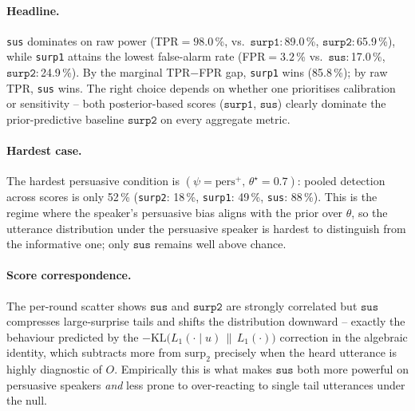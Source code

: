 \documentclass[11pt]{article}
\newcommand{\pers}{\mathrm{pers}}
\newcommand{\surp}{\mathrm{surp}}
\newcommand{\KL}{\mathrm{KL}}
\begin{document}
\paragraph{Headline.} \texttt{sus} dominates on raw power (TPR$=98.0$\,\%, vs.\ $\texttt{surp1}$:\,89.0\,\%, $\texttt{surp2}$:\,65.9\,\%), while \texttt{surp1} attains the lowest false-alarm rate (FPR$=3.2$\,\% vs.\ $\texttt{sus}$:\,17.0\,\%, $\texttt{surp2}$:\,24.9\,\%).  By the marginal TPR$-$FPR gap, \texttt{surp1} wins (85.8\,\%); by raw TPR, \texttt{sus} wins.  The right choice depends on whether one prioritises calibration or sensitivity -- both posterior-based scores ($\texttt{surp1}$, $\texttt{sus}$) clearly dominate the prior-predictive baseline $\texttt{surp2}$ on every aggregate metric.  \paragraph{Hardest case.} The hardest persuasive condition is $(\psi{=}\pers^{+},\,\theta^\star{=}0.7)$: pooled detection across scores is only 52\,\% (\texttt{surp2}: 18\,\%, \texttt{surp1}: 49\,\%, \texttt{sus}: 88\,\%).  This is the regime where the speaker's persuasive bias aligns with the prior over $\theta$, so the utterance distribution under the persuasive speaker is hardest to distinguish from the informative one; only $\texttt{sus}$ remains well above chance.  \paragraph{Score correspondence.} The per-round scatter shows $\texttt{sus}$ and $\texttt{surp2}$ are strongly correlated but $\texttt{sus}$ compresses large-surprise tails and shifts the distribution downward -- exactly the behaviour predicted by the $-\KL\bigl(L_1(\cdot\mid u)\,\|\,L_1(\cdot)\bigr)$ correction in the algebraic identity, which subtracts more from $\surp_2$ precisely when the heard utterance is highly diagnostic of $O$.  Empirically this is what makes $\texttt{sus}$ both more powerful on persuasive speakers \emph{and} less prone to over-reacting to single tail utterances under the null.
\end{document}
